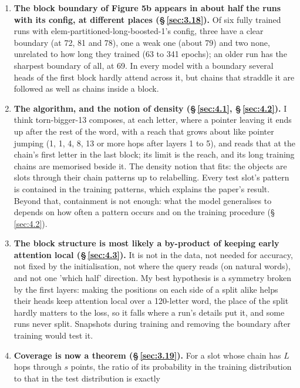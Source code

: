 \documentclass[paper=a4,fontsize=11pt,DIV=11,parskip=half,headings=small,numbers=noendperiod]{scrartcl}
\DeclareRobustCommand{\lead}[1]{\textsf{\bfseries\color{accent}#1}}
\DeclareRobustCommand{\code}[1]{{\fontseries{m}\ttfamily #1}}
\begin{document}
\begin{enumerate}
  model is a little better at 15 to 22 hops (by 2 to 18 points, in every cell) and has the same shape of decline
  and the same memorisation.
\item \lead{The block boundary of Figure 5b appears in about half the runs with its config, at different places
  (\S\,\ref{sec:3.18}).} Of six fully trained runs with
  \code{elem-\allowbreak{}partitioned-\allowbreak{}long-\allowbreak{}boosted-\allowbreak{}1}’s config, three
  have a clear boundary (at 72, 81 and 78), one a weak one (about 79) and two none, unrelated to how long they
  trained (63 to 341 epochs); an older run has the sharpest boundary of all, at 69. In every model with a
  boundary several heads of the first block hardly attend across it, but chains that straddle it are followed as
  well as chains inside a block.
\item \lead{The algorithm, and the notion of density (\S\,\ref{sec:4.1}, \S\,\ref{sec:4.2}).} I think
  \code{torn-\allowbreak{}bigger-\allowbreak{}13} composes, at each letter, where a pointer leaving it ends up
  after the rest of the word, with a reach that grows about like pointer jumping (1, 1, 4, 8, 13 or more hops
  after layers 1 to 5), and reads that at the chain’s first letter in the last block; its limit is the reach,
  and its long training chains are memorised beside it. The density notion that fits: the objects are slots
  through their chain patterns up to relabelling. Every test slot’s pattern is contained in the training
  patterns, which explains the paper’s result. Beyond that, containment is not enough: what the model
  generalises to depends on how often a pattern occurs and on the training procedure (\S\,\ref{sec:4.2}).
\item \lead{The block structure is most likely a by-product of keeping early attention local
  (\S\,\ref{sec:4.3}).} It is not in the data, not needed for accuracy, not fixed by the initialisation, not
  where the query reads (on natural words), and not one ’which half’ direction. My best hypothesis is a symmetry
  broken by the first layers: making the positions on each side of a split alike helps their heads keep
  attention local over a 120-letter word, the place of the split hardly matters to the loss, so it falls where a
  run’s details put it, and some runs never split. Snapshots during training and removing the boundary after
  training would test it.
\item \lead{Coverage is now a theorem (\S\,\ref{sec:3.19}).} For a slot whose chain has $L$ hops through $s$
  points, the ratio of its probability in the training distribution to that in the test distribution is exactly

\end{enumerate}
\end{document}

